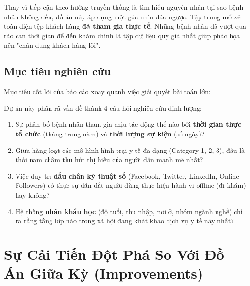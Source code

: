 \documentclass[12pt,a4paper]{article}
\begin{document}
Thay vì tiếp cận theo hướng truyền thống là tìm hiểu nguyên nhân tại sao bệnh nhân không đến, đồ án này áp dụng một góc nhìn đảo ngược: Tập trung mổ xẻ toàn diện tệp khách hàng \textbf{đã tham gia thực tế}. Những bệnh nhân đã vượt qua rào cản thời gian để đến khám chính là tập dữ liệu quý giá nhất giúp phác họa nên "chân dung khách hàng lõi".

\subsection{Mục tiêu nghiên cứu}
Mục tiêu cốt lõi của báo cáo xoay quanh việc giải quyết bài toán lớn:

\begin{center}
\end{center}

Dự án này phân rã vấn đề thành 4 câu hỏi nghiên cứu định lượng:
\begin{enumerate}[label=\textbf{\arabic*.}, leftmargin=*]
    \item Sự phân bố bệnh nhân tham gia chịu tác động thế nào bởi \textbf{thời gian thực tổ chức} (tháng trong năm) và \textbf{thời lượng sự kiện} (số ngày)?
    \item Giữa hàng loạt các mô hình hình trại y tế đa dạng (Category 1, 2, 3), đâu là thỏi nam châm thu hút thị hiếu của người dân mạnh mẽ nhất?
    \item Việc duy trì \textbf{dấu chân kỹ thuật số} (Facebook, Twitter, LinkedIn, Online Followers) có thực sự dẫn dắt người dùng thực hiện hành vi offline (đi khám) hay không?
    \item Hệ thống \textbf{nhân khẩu học} (độ tuổi, thu nhập, nơi ở, nhóm ngành nghề) chỉ ra rằng tầng lớp nào trong xã hội đang khát khao dịch vụ y tế này nhất?
\end{enumerate}

\section{Sự Cải Tiến Đột Phá So Với Đồ Án Giữa Kỳ (Improvements)}
\end{document}
